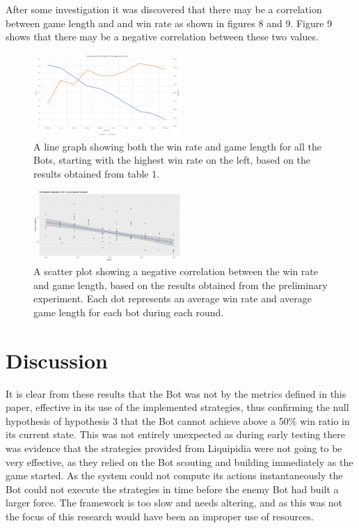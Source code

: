 \documentclass[journal]{IEEEtran}
\begin{document}
	After some investigation it was discovered that there may be a correlation between game length and and win rate as shown in figures 8 and 9. Figure 9 shows that there may be a negative correlation between these two values.
	\begin{figure}[H]
		\centering
		\includegraphics[width=0.5\textwidth]{WinTimeLineWithBot}
		\caption{A line graph showing both the win rate and game length for all the Bots, starting with the highest win rate on the left, based on the results obtained from table 1.}
		\label{Fig7}
	\end{figure}
	\begin{figure}[H]
		\centering
		\includegraphics[width=0.5\textwidth]{ScatterWinvsDurLine}
		\caption{A scatter plot showing a negative correlation between the win rate and game length, based on the results obtained from the preliminary experiment. Each dot represents an average win rate and average game length for each bot during each round.}
		\label{Fig8}
	\end{figure}
	\section{Discussion}
	It is clear from these results that the Bot was not by the metrics defined in this paper, effective in its use of the implemented strategies, thus confirming the null hypothesis of hypothesis 3 that the Bot cannot achieve above a 50\% win ratio in its current state. This was not entirely unexpected as during early testing there was evidence that the strategies provided from Liquipidia were not going to be very effective, as they relied on the Bot scouting and building immediately as the game started. As the system could not compute its actions instantaneously the Bot could not execute the strategies in time before the enemy Bot had built a larger force. The framework is too slow and needs altering, and as this was not the focus of this research would have been an improper use of resources.
	
\end{document}
